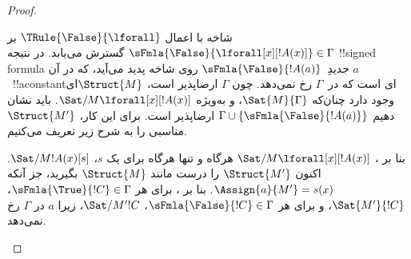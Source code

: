 \documentclass[../../../include/open-logic-section]{subfiles}
\begin{document}
\begin{proof}
\begin{enumerate}
{\item شاخه با اعمال $\TRule{\False}{\lforall}$ بر
  $\sFmla{\False}{\lforall[x][!A(x)]} \in \Gamma$ گسترش می‌یابد. در
  نتیجه !!{signed formula} جدیدِ~$\sFmla{\False}{!A(a)}$ روی شاخه پدید
  می‌آید، که در آن $a$~!!a{constant}ای است که در~$\Gamma$ رخ نمی‌دهد.
  چون $\Gamma$ ارضاپذیر است، $\Struct{M}$ای وجود دارد چنان‌که
  $\Sat{M}{\Gamma}$، و به‌ویژه
  $\Sat/{M}{\lforall[x][!A(x)]}$. باید نشان دهیم
  $\Gamma \cup \{\sFmla{\False}{!A(a)}\}$ ارضاپذیر است. برای این کار،
  $\Struct{M'}$ مناسبی را به شرح زیر تعریف می‌کنیم.

  بنا بر ،
  $\Sat/{M}{\lforall[x][!A(x)]}$ هرگاه و تنها هرگاه برای یک $s$،
  $\Sat/{M}{!A(x)}[s]$. اکنون $\Struct{M'}$ را درست مانند
  $\Struct{M}$ بگیرید، جز آنکه $\Assign{a}{M'} = s(x)$. بنا بر
  ، برای هر
  $\sFmla{\True}{!C} \in \Gamma$، $\Sat{M'}{!C}$، و برای هر
  $\sFmla{\False}{!C} \in \Gamma$، $\Sat/{M'}{!C}$، زیرا $a$ در
  $\Gamma$ رخ نمی‌دهد.

}
\end{enumerate}
\end{proof}
\end{document}
